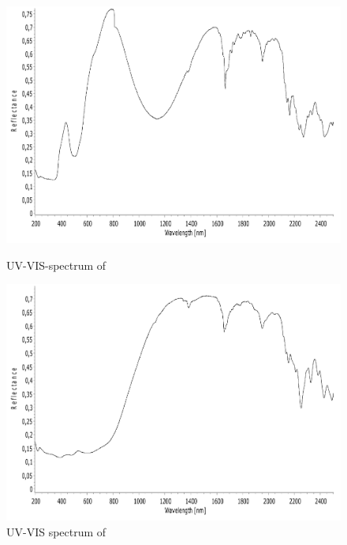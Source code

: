 \begin{figure}[!htpb]
\centering
\includegraphics[scale=0.43]{figures/CoA4MOP-VIS.pdf}
\caption*{UV-VIS-spectrum of \ce{[Co(N_3)_2(4-MeOpy)_4]}}
\label{fig:CoA4MOP_vis}
\includegraphics[scale=0.43]{figures/CuA4MOP-VIS.pdf}
\caption*{UV-VIS spectrum of }
\label{fig:CuA4MOP_vis}
\end{figure}

